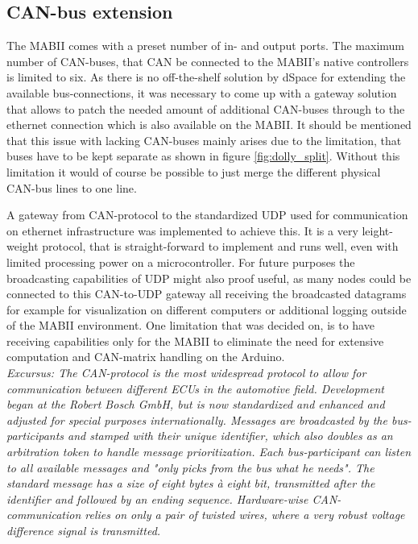 \documentclass[ExampleMasters.tex]{subfiles}
\begin{document}
\subsection{CAN-bus extension}
\label{sec:can_udp_gateway}
The \gls{MABII} comes with a preset number of in- and output ports. The maximum number of CAN-buses, that \gls{CAN} be connected to the \gls{MABII}'s native controllers is limited to six. As there is no off-the-shelf solution by dSpace for extending the available bus-connections, it was necessary to come up with a gateway solution that allows to patch the needed amount of additional \gls{CAN}-buses through to the ethernet connection which is also available on the \gls{MABII}. It should be mentioned that this issue with lacking CAN-buses mainly arises due to the limitation, that buses have to be kept separate as shown in figure \ref{fig:dolly_split}. Without this limitation it would of course be possible to just merge the different physical CAN-bus lines to one line.

A gateway from CAN-protocol to the standardized \gls{UDP} used for communication on ethernet  infrastructure was implemented to achieve this. It is a very leight-weight protocol, that is straight-forward to implement and runs well, even with limited processing power on a microcontroller. For future purposes the broadcasting capabilities of \gls{UDP} might also proof useful, as many nodes could be connected to this \gls{CAN}-to-\gls{UDP} gateway all receiving the broadcasted datagrams for example for visualization on different computers or additional logging outside of the \gls{MABII} environment. One limitation that was decided on, is to have receiving capabilities only for the \gls{MABII} to eliminate the need for extensive computation and CAN-matrix handling on the Arduino. \\


\textit{Excursus: The \gls{CAN}-protocol is the most widespread protocol to allow for communication between different \gls{ECU}s in the automotive field. Development began at the Robert Bosch GmbH, but is now standardized and enhanced and adjusted for special purposes internationally. Messages are broadcasted by the bus-participants and stamped with their unique identifier, which also doubles as an arbitration token to handle message prioritization. Each bus-participant can listen to all available messages and "only picks from the bus what he needs". The standard message has a size of eight bytes \`{a} eight bit, transmitted after the identifier and followed by an ending sequence. Hardware-wise \gls{CAN}-communication relies on only a pair of twisted wires, where a very robust voltage difference signal is transmitted. }\cite{CAN_intro}\\
\end{document}
